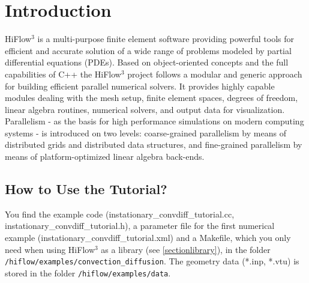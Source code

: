 \documentclass[a4paper, 11pt, twoside]{article}
\begin{document}
\pagestyle{empty}



\tableofcontents

\newpage
\pagestyle{plain}
\vspace{0.5cm}
\section{Introduction}

HiFlow$^3$ is a multi-purpose finite element software providing powerful tools for efficient and accurate solution of a wide range of problems modeled by partial differential equations (PDEs). Based on object-oriented concepts and the full capabilities of C++ the HiFlow$^3$ project follows a modular and generic approach for building efficient parallel numerical solvers. It provides highly capable modules dealing with the mesh setup, finite element spaces, degrees of freedom, linear algebra routines, numerical solvers, and output data for visualization. Parallelism - as the basis for high performance simulations on modern computing systems - is introduced on two levels: coarse-grained parallelism by means of distributed grids and distributed data structures, and fine-grained parallelism by means of platform-optimized linear algebra back-ends.

\subsection{How to Use the Tutorial?}
You find the example code (instationary\_convdiff\_tutorial.cc, instationary\_convdiff\_tutorial.h), a parameter file for the first numerical example (instationary\_convdiff\_tutorial.xml) and a Makefile, which you only need when using HiFlow$^3$ as a library (see \ref{sectionlibrary}), in the folder \newline \verb'/hiflow/examples/convection_diffusion'. The geometry data (*.inp, *.vtu) is stored in the folder \verb'/hiflow/examples/data'.
\end{document}
